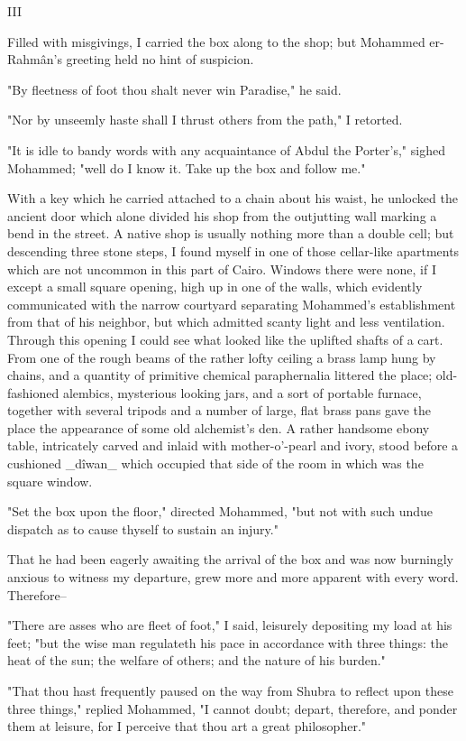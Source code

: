 III

Filled with misgivings, I carried the box along to the shop; but
Mohammed er-Rahmân's greeting held no hint of suspicion.

"By fleetness of foot thou shalt never win Paradise," he said.

"Nor by unseemly haste shall I thrust others from the path,"
I retorted.

"It is idle to bandy words with any acquaintance of Abdul the
Porter's," sighed Mohammed; "well do I know it. Take up the box
and follow me."

With a key which he carried attached to a chain about his waist,
he unlocked the ancient door which alone divided his shop from the
outjutting wall marking a bend in the street. A native shop is usually
nothing more than a double cell; but descending three stone steps,
I found myself in one of those cellar-like apartments which are not
uncommon in this part of Cairo. Windows there were none, if I except
a small square opening, high up in one of the walls, which evidently
communicated with the narrow courtyard separating Mohammed's
establishment from that of his neighbor, but which admitted scanty
light and less ventilation. Through this opening I could see what
looked like the uplifted shafts of a cart. From one of the rough
beams of the rather lofty ceiling a brass lamp hung by chains, and
a quantity of primitive chemical paraphernalia littered the place;
old-fashioned alembics, mysterious looking jars, and a sort of
portable furnace, together with several tripods and a number of large,
flat brass pans gave the place the appearance of some old alchemist's
den. A rather handsome ebony table, intricately carved and inlaid with
mother-o'-pearl and ivory, stood before a cushioned _dîwan_ which
occupied that side of the room in which was the square window.

"Set the box upon the floor," directed Mohammed, "but not with such
undue dispatch as to cause thyself to sustain an injury."

That he had been eagerly awaiting the arrival of the box and was now
burningly anxious to witness my departure, grew more and more apparent
with every word. Therefore--

"There are asses who are fleet of foot," I said, leisurely depositing
my load at his feet; "but the wise man regulateth his pace in
accordance with three things: the heat of the sun; the welfare of
others; and the nature of his burden."

"That thou hast frequently paused on the way from Shubra to reflect
upon these three things," replied Mohammed, "I cannot doubt; depart,
therefore, and ponder them at leisure, for I perceive that thou art
a great philosopher."

